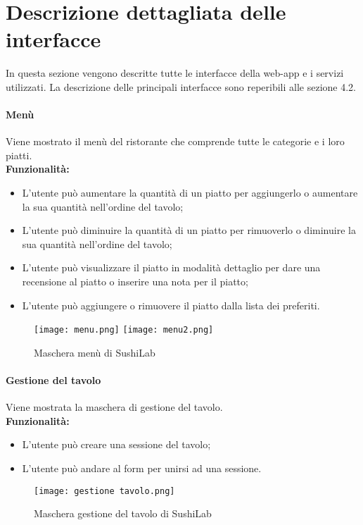 \label{cap:appendice c}
\chapter{Descrizione dettagliata delle interfacce}
In questa sezione vengono descritte tutte le interfacce della web-app e i servizi utilizzati. La descrizione delle principali interfacce sono reperibili alle sezione 4.2.
\subsubsection{Menù}
Viene mostrato il menù del ristorante che comprende tutte le categorie e i loro piatti.\\
\textbf{Funzionalità:}
\begin{itemize}
    \item L'utente può aumentare la quantità di un piatto per aggiungerlo o aumentare la sua quantità nell'ordine del tavolo;
    \item L'utente può diminuire la quantità di un piatto per rimuoverlo o diminuire la sua quantità nell'ordine del tavolo;
    \item L'utente può visualizzare il piatto in modalità dettaglio per dare una recensione al piatto o inserire una nota per il piatto;
    \item L'utente può aggiungere o rimuovere il piatto dalla lista dei preferiti.
\end{itemize}
\begin{figure}[H]
    \centering
    \texttt{[image: menu.png]}
    \texttt{[image: menu2.png]}
    \caption{Maschera menù di SushiLab}
\end{figure}


\subsubsection{Gestione del tavolo}
Viene mostrata la maschera di gestione del tavolo.\\
\textbf{Funzionalità:}
\begin{itemize}
    \item L'utente può creare una sessione del tavolo;
    \item L'utente può andare al form per unirsi ad una sessione.
\end{itemize}
\begin{figure}[H]
    \centering
    \texttt{[image: gestione tavolo.png]}
    \caption{Maschera gestione del tavolo di SushiLab}
\end{figure}


